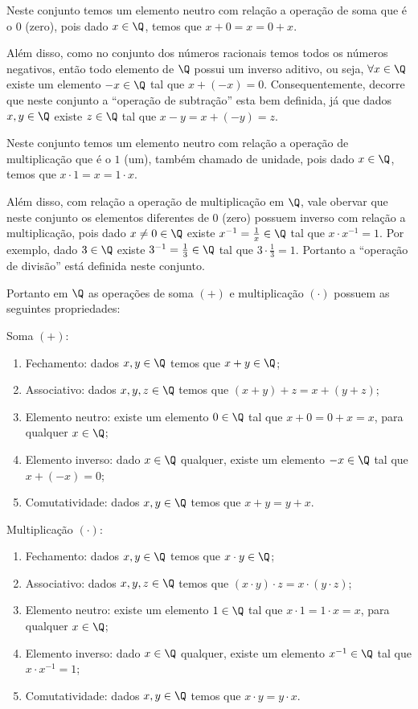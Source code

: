    Neste conjunto temos um elemento neutro com relação a operação de soma que é o $0$ (zero), pois dado $x \in \Q$, temos que $x+0= x= 0+x$.

 Além disso, como no conjunto dos números racionais temos todos os números negativos, então todo elemento de $\Q$ possui um inverso aditivo, ou seja, $\forall x \in \Q$ existe um elemento $-x \in \Q$ tal que $x + (-x)=0$. Consequentemente, decorre que neste conjunto a ``operação de subtração'' esta bem definida, já que dados $x, y \in \Q$ existe $z \in \Q$ tal que $x - y= x+ (-y)= z$.

 Neste conjunto temos um elemento neutro com relação a operação de multiplicação que é o $1$ (um), também chamado de unidade, pois dado $x \in \Q$, temos que $x \cdot 1= x= 1 \cdot x$.

 Além disso, com relação a operação de multiplicação em $\Q$, vale obervar que neste conjunto os elementos diferentes de $0$ (zero) possuem inverso com relação a multiplicação, pois dado $x \neq 0 \in \Q$ existe $x^{-1}= \frac{1}{x} \in \Q$ tal que $x \cdot x^{-1}= 1$. Por exemplo, dado $3 \in \Q$ existe $3^{-1}= \frac{1}{3} \in \Q$ tal que $3 \cdot \frac{1}{3}= 1$. Portanto a ``operação de divisão'' está definida neste conjunto.

   \vskip0.3cm

 Portanto em $\Q$ as operações de soma $(+)$ e multiplicação $(\cdot)$ possuem as seguintes propriedades:

 Soma $(+)$:
 \begin{enumerate}[1)]
 \item Fechamento: dados $x, y \in \Q$ temos que $x+y \in \Q$;
 \item Associativo: dados $x, y, z \in \Q$ temos que $(x+y)+z= x+(y+z)$;
 \item Elemento neutro: existe um elemento $0 \in \Q$ tal que $x+0=0+x=x$, para qualquer $x \in \Q$;
 \item Elemento inverso: dado $x \in \Q$ qualquer, existe um elemento $-x \in \Q$ tal que $x+(-x)=0$;
 \item Comutatividade: dados $x, y \in \Q$ temos que $x+y= y+x$.
 \end{enumerate}

  Multiplicação $(\cdot)$:
 \begin{enumerate}[1)]
 \item Fechamento: dados $x, y \in \Q$ temos que $x \cdot y \in \Q$;
 \item Associativo: dados $x, y, z \in \Q$ temos que $(x \cdot y) \cdot z= x \cdot (y \cdot z)$;
 \item Elemento neutro: existe um elemento $1 \in \Q$ tal que $x \cdot 1= 1 \cdot x= x$, para qualquer $x \in \Q$;
 \item Elemento inverso: dado $x \in \Q$ qualquer, existe um elemento $x^{-1} \in \Q$ tal que $x \cdot x^{-1}= 1$;
 \item Comutatividade: dados $x, y \in \Q$ temos que $x \cdot y= y \cdot x$.
 \end{enumerate}


